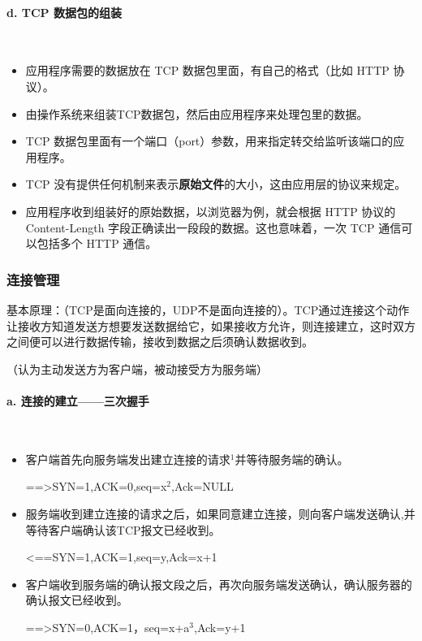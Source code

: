 \documentclass[UTF8]{article}%
\begin{document}
\paragraph{d. TCP 数据包的组装}~{}

\begin{itemize}
    \item 应用程序需要的数据放在 TCP 数据包里面，有自己的格式（比如 HTTP 协议）。
    \item 由操作系统来组装TCP数据包，然后由应用程序来处理包里的数据。
    \item TCP 数据包里面有一个端口（port）参数，用来指定转交给监听该端口的应用程序。
    \item TCP 没有提供任何机制来表示\textbf{原始文件}的大小，这由应用层的协议来规定。
    \item 应用程序收到组装好的原始数据，以浏览器为例，就会根据 HTTP 协议的 Content-Length 字段正确读出一段段的数据。这也意味着，一次 TCP 通信可以包括多个 HTTP 通信。
\end{itemize}

\subsubsection{连接管理}

基本原理：（TCP是面向连接的，UDP不是面向连接的）。TCP通过连接这个动作让接收方知道发送方想要发送数据给它，如果接收方允许，则连接建立，这时双方之间便可以进行数据传输，接收到数据之后须确认数据收到。

（认为主动发送方为客户端，被动接受方为服务端）

\paragraph{a. 连接的建立——三次握手}~{}

\begin{itemize}
    \item 客户端首先向服务端发出建立连接的请求$^1$并等待服务端的确认。
    
    ==>SYN=1,ACK=0,seq=x$^2$,Ack=NULL

    \item 服务端收到建立连接的请求之后，如果同意建立连接，则向客户端发送确认,并等待客户端确认该TCP报文已经收到。
    
    <==SYN=1,ACK=1,seq=y,Ack=x+1

    \item 客户端收到服务端的确认报文段之后，再次向服务端发送确认，确认服务器的确认报文已经收到。
    
    ==>SYN=0,ACK=1，seq=x+a$^3$,Ack=y+1

\end{itemize}
\end{document}
